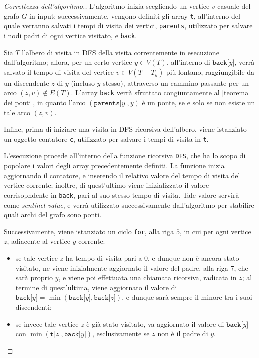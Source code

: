 \documentclass[a4paper, 12pt]{report}
\begin{document}
    \begin{proof}[Correttezza dell'algoritmo.]
        L'algoritmo inizia scegliendo un vertice $v$ casuale del grafo $G$ in input; successivamente, vengono definiti gli array \texttt{t}, all'interno del quale verranno salvati i tempi di visita dei vertici, \texttt{parents}, utilizzato per salvare i nodi padri di ogni vertice visitato, e \texttt{back}.

        Sia $T$ l'albero di visita in DFS della visita correntemente in esecuzione dall'algoritmo; allora, per un certo vertice $y \in V(T)$, all'interno di $\texttt{back[}y\texttt{]}$, verrà salvato il tempo di visita del vertice $v \in V(T - T_y)$ più lontano, raggiungibile da un discendente $z$ di $y$ (incluso $y$ stesso), attraverso un cammino passante per un arco $(z, v) \notin E(T)$. L'array \texttt{back} verrà sfruttato congiuntamente al \cref{teorema dei ponti}, in quanto l'arco $(\texttt{parents[}y\texttt{]}, y)$ è un ponte, se e solo se non esiste un tale arco $(z, v)$.

        Infine, prima di iniziare una visita in DFS ricorsiva dell'albero, viene istanziato un oggetto contatore \texttt{c}, utilizzato per salvare i tempi di visita in \texttt{t}.

        L'esecuzione procede all'interno della funzione ricorsiva \texttt{DFS}, che ha lo scopo di popolare i valori degli array precedentemente definiti. La funzione inizia aggiornando il contatore, e inserendo il relativo valore del tempo di visita del vertice corrente; inoltre, di quest'ultimo viene inizializzato il valore corrisopndente in \texttt{back}, pari al suo stesso tempo di visita. Tale valore servirà come \textit{sentinel value}, e verrà utilizzato successivamente dall'algoritmo per stabilire quali archi del grafo sono ponti.

        Successivamente, viene istanziato un ciclo \texttt{for}, alla riga $5$, in cui per ogni vertice $z$, adiacente al vertice $y$ corrente:

        \begin{itemize}
            \item se tale vertice $z$ ha tempo di visita pari a $0$, e dunque non è ancora stato visitato, ne viene inizialmente aggiornato il valore del padre, alla riga $7$, che sarà proprio $y$, e viene poi effettuata una chiamata ricorsiva, radicata in $z$; al termine di quest'ultima, viene aggiornato il valore di $\texttt{back[}y\texttt{]} = \min(\texttt{back[}y\texttt{]}, \texttt{back[}z\texttt{]})$, e dunque sarà sempre il minore tra i suoi discendenti;
            \item se invece tale vertice $z$ è già stato visitato, va aggiornato il valore di $\texttt{back[}y\texttt{]}$ con $\min(\texttt{t[}z\texttt{]}, \texttt{back[}y\texttt{]})$, esclusivamente se $z$ non è il padre di $y$.
        \end{itemize}


\end{proof}
\end{document}

